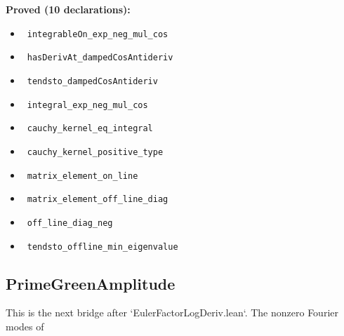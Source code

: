 \documentclass{report}
\theoremstyle{definition}
\begin{document}
\noindent\textbf{Proved (10 declarations):}
\begin{itemize}
  \item {}\leanok\ \texttt{integrableOn\_exp\_neg\_mul\_cos}
  \item {}\leanok\ \texttt{hasDerivAt\_dampedCosAntideriv}
  \item {}\leanok\ \texttt{tendsto\_dampedCosAntideriv}
  \item {}\leanok\ \texttt{integral\_exp\_neg\_mul\_cos}
  \item {}\leanok\ \texttt{cauchy\_kernel\_eq\_integral}
  \item {}\leanok\ \texttt{cauchy\_kernel\_positive\_type}
  \item {}\leanok\ \texttt{matrix\_element\_on\_line}
  \item {}\leanok\ \texttt{matrix\_element\_off\_line\_diag}
  \item {}\leanok\ \texttt{off\_line\_diag\_neg}
  \item {}\leanok\ \texttt{tendsto\_offline\_min\_eigenvalue}
\end{itemize}

\subsection{PrimeGreenAmplitude}
This is the next bridge after `EulerFactorLogDeriv.lean`.  The nonzero Fourier modes of
\end{document}

